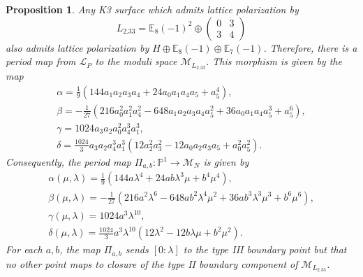\documentclass[10pt]{amsart}
\numberwithin{equation}{section}
\theoremstyle{plain}
\newtheorem{proposition}[theorem]{Proposition}
\theoremstyle{definition}
\theoremstyle{remark}
\begin{document}
\begin{proposition}\label{proposition:2.33}
  Any K3 surface which admits lattice polarization by
  \[
    L_{2.33} = \mathbb{E}_8(-1)^2 \oplus \left( \begin{array}{rr} 0 & 3  \\ 3 & 4 \end{array} \right)
  \]
  also admits lattice polarization by \(H \oplus \mathbb{E}_8(-1) \oplus \mathbb{E}_7(-1)\). Therefore, there is a period map from \(\mathcal{L}_P\) to the moduli space \(\mathcal{M}_{L_{2.33}}\). This morphism is given by the map
  \[
    \begin{array}{l}
      \alpha = \frac{1}{9} (144 a_{1} a_{2} a_{3} a_{4} + 24 a_{0} a_{1} a_{4} a_{5} + a_{5}^{4}),  \\  \beta = -\frac{1}{27} (216 a_{0}^{2} a_{1}^{2} a_{4}^{2} - 648 a_{1} a_{2} a_{3} a_{4} a_{5}^{2} + 36 a_{0} a_{1} a_{4} a_{5}^{3} + a_{5}^{6}), \\
      \gamma  = 1024  a_{3}  a_{2}  a_{0}^{2}  a_{4}^{3}  a_{1}^{3}, \\  \delta= \frac{1024}{3} a_{3} a_{2}  a_{4}^{3}  a_{1}^{3}  (12 a_{2}^{2} a_{3}^{2} - 12 a_{0} a_{2} a_{3} a_{5} + a_{0}^{2} a_{5}^{2}).
    \end{array}
  \]
  Consequently, the period map \(\Pi_{a,b} \colon \mathbb{P}^1\rightarrow \mathcal{M}_N\) is given by
  \[
    \begin{array}{l}
      \alpha(\mu,\lambda) = \frac{1}{9} (144 a\lambda^4 + 24 ab\lambda^3\mu + b^{4}\mu^4),  \\  \beta(\mu,\lambda) = -\frac{1}{27}  (216 a^2\lambda^6 - 648 ab^2\lambda^4\mu^2 + 36 ab^3\lambda^3\mu^3 + b^6\mu^6), \\
      \gamma(\mu,\lambda)  = 1024  a^3\lambda^{10}, \\  \delta(\mu,\lambda) = \frac{1024}{3} a^3\lambda^{10}  (12 \lambda^2 - 12 b\lambda\mu + b^{2}\mu^2).
    \end{array}
  \]
  For each \(a,b\), the map \(\Pi_{a,b}\) sends \([0:\lambda]\) to the type III boundary point but that no other point maps to closure of the type II boundary component of \(\mathcal{M}_{L_{2.33}}\).
\end{proposition}
\end{document}
